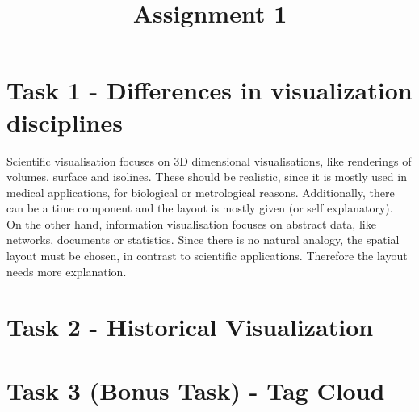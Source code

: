 \documentclass[a4paper]{article}
\date{}
\author{}
\title{Assignment 1}
\begin{document}
	\maketitle 
	\thispagestyle{fancy}
	
	\section*{Task 1 - Differences in visualization disciplines}
	
	Scientific visualisation focuses on 3D dimensional visualisations, like renderings of volumes, surface and isolines. 
	These should be realistic, since it is mostly used in medical applications, for biological or metrological reasons. 
	Additionally, there can be a time component and the layout is mostly given (or self explanatory).\\ \linebreak
	On the other hand, information visualisation focuses on abstract data, like networks, documents or statistics. 
	Since there is no natural analogy, the spatial layout must be chosen, in contrast to scientific applications. 
	Therefore the layout needs more explanation. 
	
	
	\section*{Task 2 - Historical Visualization}
	
	\section*{Task 3 (Bonus Task) - Tag Cloud}
\end{document}
